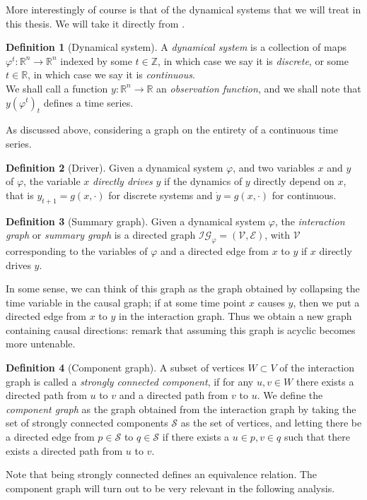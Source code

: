 \documentclass[11pt, a4paper]{memoir}
\theoremstyle{plain}
\theoremstyle{definition}
\newtheorem{defn}{Definition}
\newcommand{\mZ}{\mathbb{Z}}
\newcommand{\mR}{\mathbb{R}}
\begin{document}
More interestingly of course is that of the dynamical systems that we will treat in this thesis. We will take it directly from \cite{mathFound}.
\begin{defn}[Dynamical system]
A \emph{dynamical system} is a collection of maps $\varphi^t:\mR^n\to\mR^n$ indexed by some $t\in \mZ$, in which case we say it is \emph{discrete}, or some $t\in \mR$, in which case we say it is \emph{continuous}.\\
We shall call a function $y:\mR^n\to \mR$ an \emph{observation function}, and we shall note that $y(\varphi^t)_t$ defines a time series.
\end{defn}
As discussed above, considering a graph on the entirety of a continuous time series.
\begin{defn}[Driver]
Given a dynamical system $\varphi$, and two variables $x$ and $y$ of $\varphi$, the variable $x$ \emph{directly drives} $y$ if the dynamics of $y$ directly depend on $x$, that is $y_{t+1}=g(x,\cdot)$ for discrete systems and $\dot{y}=g(x,\cdot)$ for continuous.
\end{defn}
\begin{defn}[Summary graph]
Given a dynamical system $\varphi$, the \emph{interaction graph} or \emph{summary graph} is a directed graph $\mathcal{IG}_\varphi=(\mathcal{V},\mathcal{E})$, with $\mathcal{V}$ corresponding to the variables of $\varphi$ and a directed edge from $x$ to $y$ if $x$ directly drives $y$.
\end{defn}
In some sense, we can think of this graph as the graph obtained by collapsing the time variable in the causal graph; if at some time point $x$ causes $y$, then we put a directed edge from $x$ to $y$ in the interaction graph. Thus we obtain a new graph containing causal directions: remark that assuming this graph is acyclic becomes more untenable.
\begin{defn}[Component graph]
A subset of vertices $W\subset V$ of the interaction graph is called a \emph{strongly connected component}, if for any $u,v\in W$ there exists a directed path from $u$ to $v$ and a directed path from $v$ to $u$. We define the \emph{component graph} as the graph obtained from the interaction graph by taking the set of strongly connected components $\mathcal{S}$ as the set of vertices, and letting there be a directed edge from $p\in \mathcal{S}$ to $q\in \mathcal{S}$ if there exists a $u\in p,v\in q$ such that there exists a directed path from $u$ to $v$.
\end{defn}
Note that being strongly connected defines an equivalence relation. The component graph will turn out to be very relevant in the following analysis.
\end{document}
